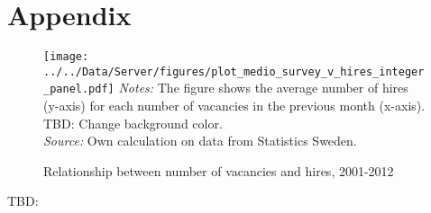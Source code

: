 \appendix
\section{Appendix}
\label{sec:appendix}



\begin{figure}[h]
\centering
\caption{Relationship between number of vacancies and hires, 2001-2012}
\texttt{[image: ../../Data/Server/figures/plot\_medio\_survey\_v\_hires\_integer\_panel.pdf]}
\flushleft
\footnotesize{\emph{Notes:} The figure shows the average number of hires (y-axis) for each number of vacancies in the previous month (x-axis). TBD: Change background color.} \\
\footnotesize{\emph{Source:} Own calculation on data from Statistics Sweden.}
\label{fig:crossplot_panel}
\end{figure}

TBD:


%
